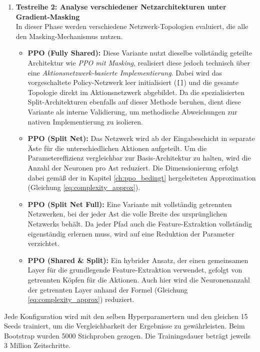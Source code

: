 \begin{enumerate}
    \item \textbf{Testreihe 2: Analyse verschiedener Netzarchitekturen unter Gradient\hyp{}Masking} \\
    In dieser Phase werden verschiedene Netzwerk-Topologien evaluiert, die alle den Masking-Mechanismus nutzen.
    \begin{itemize}
        \item \textbf{\ac{PPO} (Fully Shared):} Diese Variante nutzt dieselbe vollständig geteilte Architektur wie \textit{\ac{PPO} mit Masking}, realisiert diese jedoch technisch über eine \textit{Aktionsnetzwerk\hyp{}basierte Implementierung}. Dabei wird das vorgeschaltete Policy\hyp{}Netzwerk leer initialisiert (\texttt{[]}) und die gesamte Topologie direkt im Aktionsnetzwerk abgebildet. Da die spezialisierten Split\hyp{}Architekturen ebenfalls auf dieser Methode beruhen, dient diese Variante als interne Validierung, um methodische Abweichungen zur nativen Implementierung zu isolieren.
        \item \textbf{\ac{PPO} (Split Net):} Das Netzwerk wird ab der Eingabeschicht in separate Äste für die unterschiedlichen Aktionen aufgeteilt. Um die Parametereffizienz vergleichbar zur Basis-Architektur zu halten, wird die Anzahl der Neuronen pro Ast reduziert. Die Dimensionierung erfolgt dabei gemäß der in Kapitel \ref{ch:ppo_bedingt} hergeleiteten Approximation (Gleichung \ref{eq:complexity_approx}).
        \item \textbf{\ac{PPO} (Split Net Full):} Eine Variante mit vollständig getrennten Netzwerken, bei der jeder Ast die volle Breite des ursprünglichen Netzwerks behält. Da jeder Pfad auch die Feature-Extraktion vollständig eigenständig erlernen muss, wird auf eine Reduktion der Parameter verzichtet.
        \item \textbf{\ac{PPO} (Shared \& Split):} Ein hybrider Ansatz, der einen gemeinsamen Layer für die grundlegende Feature-Extraktion verwendet, gefolgt von getrennten Köpfen für die Aktionen. Auch hier wird die Neuronenanzahl der getrennten Layer anhand der Formel (Gleichung \ref{eq:complexity_approx}) reduziert.
    \end{itemize}
\end{enumerate}

Jede Konfiguration wird mit den selben Hyperparamertern und den gleichen 15 Seeds trainiert, um die Vergleichbarkeit der Ergebnisse zu gewährleisten. Beim Bootstrap wurden 5000 Stichproben gezogen. Die Trainingsdauer beträgt jeweils 3 Million Zeitschritte.



